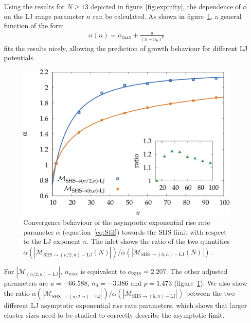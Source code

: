 Using the results for $N \geq 13$ depicted in figure~\ref{fig:expinfty}, the
dependence of $\alpha$ on the \ac{LJ} range parameter $n$ can be calculated. As
shown in figure~\ref{fig:repulsive13-14}, a general function of the form
%
\begin{align}
\label{expgrowth}
    \alpha(n)=\alpha_\text{max}+\frac{a}{(n-n_0)^{p}}
\end{align}
%
fits the results nicely, allowing the prediction of growth behaviour for
different \ac{LJ} potentials. 
%
\begin{figure}[htb]
    \centering
    \includegraphics[width=0.8\columnwidth]{kslj/repulsive13-14.pdf}
    \caption{Convergence behaviour of the asymptotic exponential rise rate
    parameter $\alpha$ (equation~\eqref{eq:Stil}) towards the \acs{SHS} limit with
    respect to the \acs{LJ} exponent $n$. The inlet shows the ratio of the two
    quantities $\alpha(|\mathcal{M}_{\text{SHS}\to (n/2,n)-\text{LJ}}(N)|)
    / \alpha(|\mathcal{M}_{\text{SHS}\to (6,n)-\text{LJ}}(N)|)$.}
    \label{fig:repulsive13-14}
\end{figure}
%
For $|\mathcal{M}_{(n/2,n)-\text{LJ}}|$, $\alpha_\text{max}$ is equivalent to
$\alpha_\text{SHS}=2.207$. The other adjusted parameters are $a=-66.588$,
$n_0=-3.386$ and $p=1.473$ (figure~\ref{fig:repulsive13-14}). We also show the
ratio $\alpha(|\mathcal{M}_{\text{SHS}\to (n/2,n)-\text{LJ}}|) /
\alpha(|\mathcal{M}_{\text{SHS}\to (6,n)-\text{LJ}}|)$ between the two different
\ac{LJ} asymptotic exponential rise rate parameters, which shows that larger cluster
sizes need to be studied to correctly describe the asymptotic limit. 

